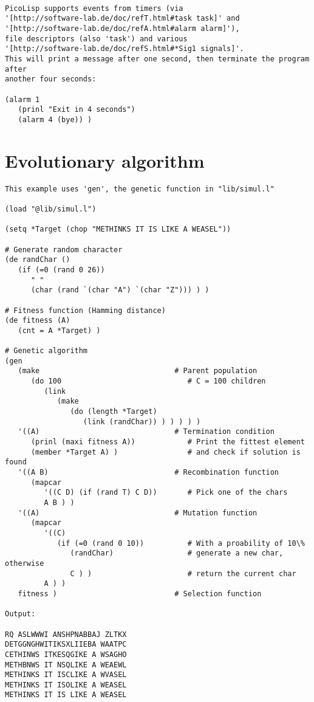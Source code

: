 \begin{verbatim}

PicoLisp supports events from timers (via
'[http://software-lab.de/doc/refT.html#task task]' and
'[http://software-lab.de/doc/refA.html#alarm alarm]'),
file descriptors (also 'task') and various
'[http://software-lab.de/doc/refS.html#*Sig1 signals]'.
This will print a message after one second, then terminate the program after
another four seconds:

(alarm 1
   (prinl "Exit in 4 seconds")
   (alarm 4 (bye)) )

\end{verbatim}

\section*{Evolutionary algorithm}

\begin{verbatim}
This example uses 'gen', the genetic function in "lib/simul.l"

(load "@lib/simul.l")

(setq *Target (chop "METHINKS IT IS LIKE A WEASEL"))

# Generate random character
(de randChar ()
   (if (=0 (rand 0 26))
      " "
      (char (rand `(char "A") `(char "Z"))) ) )

# Fitness function (Hamming distance)
(de fitness (A)
   (cnt = A *Target) )

# Genetic algorithm
(gen
   (make                               # Parent population
      (do 100                             # C = 100 children
         (link
            (make
               (do (length *Target)
                  (link (randChar)) ) ) ) ) )
   '((A)                               # Termination condition
      (prinl (maxi fitness A))            # Print the fittest element
      (member *Target A) )                # and check if solution is found
   '((A B)                             # Recombination function
      (mapcar
         '((C D) (if (rand T) C D))       # Pick one of the chars
         A B ) )
   '((A)                               # Mutation function
      (mapcar
         '((C)
            (if (=0 (rand 0 10))          # With a proability of 10\%
               (randChar)                 # generate a new char, otherwise
               C ) )                      # return the current char
         A ) )
   fitness )                           # Selection function

Output:

RQ ASLWWWI ANSHPNABBAJ ZLTKX
DETGGNGHWITIKSXLIIEBA WAATPC
CETHINWS ITKESQGIKE A WSAGHO
METHBNWS IT NSQLIKE A WEAEWL
METHINKS IT ISCLIKE A WVASEL
METHINKS IT ISOLIKE A WEASEL
METHINKS IT IS LIKE A WEASEL

\end{verbatim}

